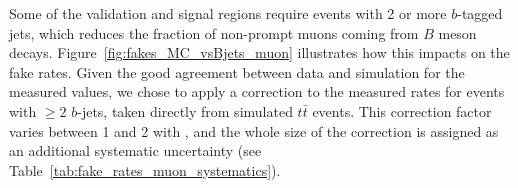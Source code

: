 \begin{table}[t!]
\def\arraystretch{1.15}
\caption{Muon fake rate measured in data and the associated statistical uncertainty. 
The systematic uncertainty originating from the subtraction of ``backgrounds'' with only prompt leptons is also displayed. }
\label{table:fake_rates_muon}
\def\arraystretch{1.15}
\centering
{}



\end{table}

Some of the validation and signal regions require events with 2 or more $b$-tagged jets, 
which reduces the fraction of non-prompt muons coming from $B$ meson decays. 
Figure~\ref{fig:fakes_MC_vsBjets_muon} illustrates how this impacts on the fake rates. 
Given the good agreement between data and simulation for the measured values, 
we chose to apply a correction to the measured rates for events with $\ge 2$ $b$-jets, 
taken directly from simulated $t\bar t$ events. 
This correction factor varies between 1 and 2 with \pt, 
and the whole size of the correction is assigned as an additional systematic uncertainty (see Table~\ref{tab:fake_rates_muon_systematics}). 

